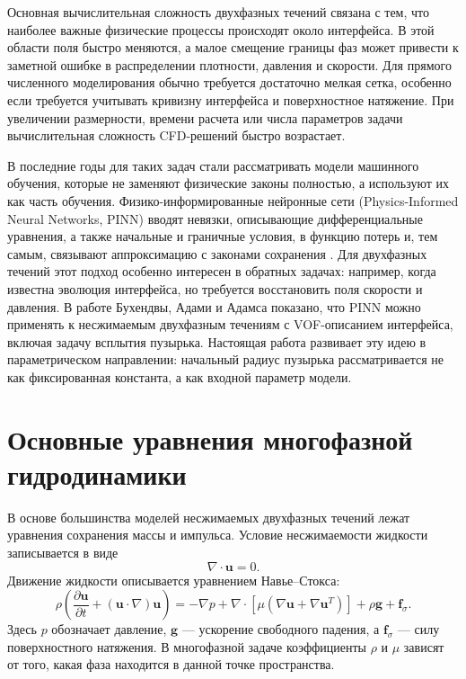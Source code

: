 Основная вычислительная сложность двухфазных течений связана с тем, что
наиболее важные физические процессы происходят около интерфейса. В этой области
поля быстро меняются, а малое смещение границы фаз может привести к заметной
ошибке в распределении плотности, давления и скорости. Для прямого численного
моделирования обычно требуется достаточно мелкая сетка, особенно если требуется
учитывать кривизну интерфейса и поверхностное натяжение. При увеличении
размерности, времени расчета или числа параметров задачи вычислительная сложность CFD-решений
быстро возрастает.

В последние годы для таких задач стали рассматривать модели машинного обучения,
которые не заменяют физические законы полностью, а используют их как часть
обучения. Физико-информированные нейронные сети (Physics-Informed Neural
Networks, PINN) вводят невязки, описывающие дифференциальные уравнения, а также начальные и граничные условия, в функцию потерь и,
тем самым, связывают аппроксимацию с законами сохранения \cite{Raissi2019}.
Для двухфазных течений этот подход особенно интересен в обратных задачах:
например, когда известна эволюция интерфейса, но требуется восстановить поля
скорости и давления. В работе Бухендвы, Адами и Адамса \cite{Buhendwa2021}
показано, что PINN можно применять к несжимаемым двухфазным течениям с
VOF-описанием интерфейса, включая задачу всплытия пузырька. Настоящая работа
развивает эту идею в параметрическом направлении: начальный радиус пузырька
рассматривается не как фиксированная константа, а как входной
параметр модели.

\section{Основные уравнения многофазной гидродинамики}

В основе большинства моделей несжимаемых двухфазных течений лежат уравнения
сохранения массы и импульса. Условие несжимаемости жидкости записывается в виде
\begin{equation}
    \nabla\cdot\mathbf{u}=0.
    \label{eq:review_incompressibility}
\end{equation}
Движение жидкости описывается уравнением Навье--Стокса:
\begin{equation}
    \rho
    \left(
        \frac{\partial\mathbf{u}}{\partial t}
        +(\mathbf{u}\cdot\nabla)\mathbf{u}
    \right)
    =
    -\nabla p
    +\nabla\cdot
    \left[
        \mu
        \left(\nabla\mathbf{u}+\nabla\mathbf{u}^{T}\right)
    \right]
    +\rho\mathbf{g}
    +\mathbf{f}_{\sigma}.
    \label{eq:review_momentum}
\end{equation}
Здесь \(p\) обозначает давление, \(\mathbf{g}\) --- ускорение свободного
падения, а \(\mathbf{f}_{\sigma}\) --- силу поверхностного натяжения. В
многофазной задаче коэффициенты \(\rho\) и \(\mu\) зависят от того, какая фаза
находится в данной точке пространства.

